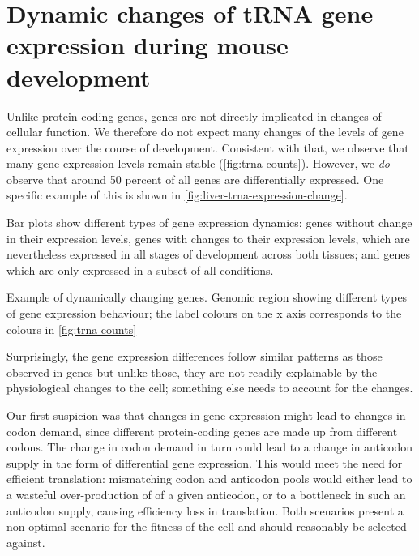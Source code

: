 \section{Dynamic changes of tRNA gene expression during mouse development}

Unlike protein-coding genes, \trna genes are not directly implicated in changes
of cellular function. We therefore do not expect many changes of the levels of
\trna gene expression over the course of development. Consistent with that, we
observe that many \trna gene expression levels remain stable
(\cref{fig:trna-counts}). However, we \emph{do} observe that around \num{50}
percent of all \trna genes are differentially expressed. One specific example of
this is shown in \cref{fig:liver-trna-expression-change}.

    {Bar plots show different types of \trna gene expression dynamics: \trna
    genes without change in their expression levels, \trna genes with changes to
    their expression levels, which are nevertheless expressed in all stages of
    development across both tissues; and \trna genes which are only expressed in
    a subset of all conditions.}

    {Example of dynamically changing \trna genes.}
    {Genomic region showing different types of \trna gene expression behaviour;
    the label colours on the x axis corresponds to the colours in
    \cref{fig:trna-counts}}

Surprisingly, the \trna gene expression differences follow similar patterns as
those observed in \mrna genes  but unlike those, they are not
readily explainable by the physiological changes to the cell; something else
needs to account for the changes.

Our first suspicion was that changes in \mrna gene expression might lead to
changes in codon demand, since different protein-coding genes are made up from
different codons. The change in codon demand in turn could lead to a change in
anticodon supply in the form of differential \trna gene expression. This would
meet the need for efficient translation: mismatching codon and anticodon pools
would either lead to a wasteful over-production of \trna[s] of a given
anticodon, or to a bottleneck in such an anticodon supply, causing efficiency
loss in translation. Both scenarios present a non-optimal scenario for the
fitness of the cell and should reasonably be selected against.

